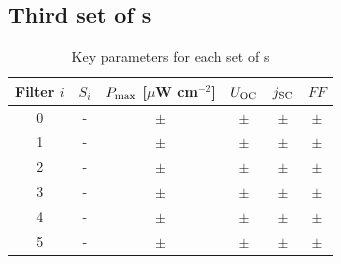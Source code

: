 \subsection{Third set of \BHSC s}

\begin{table}[h]\centering
\caption{Key parameters for each set of \BHSC s}
\label{tab:keyparams}
\begin{tabular}{@{}cccccc@{}}\toprule
Filter $i$ & $S_i$ & $P_{\text{max}}$ [$\mu$W cm$^{-2}$] & $U_{\text{OC}}$ & $j_{\text{SC}}$ & $FF$\\\midrule
0 & - & $  \pm  $ & $  \pm  $ & $  \pm  $ & $  \pm  $ \\
1 & - & $  \pm  $ & $  \pm  $ & $  \pm  $ & $  \pm  $ \\
2 & - & $  \pm  $ & $  \pm  $ & $  \pm  $ & $  \pm  $ \\
3 & - & $  \pm  $ & $  \pm  $ & $  \pm  $ & $  \pm  $ \\
4 & - & $  \pm  $ & $  \pm  $ & $  \pm  $ & $  \pm  $ \\
5 & - & $  \pm  $ & $  \pm  $ & $  \pm  $ & $  \pm  $ \\\bottomrule
\end{tabular}
\end{table}

